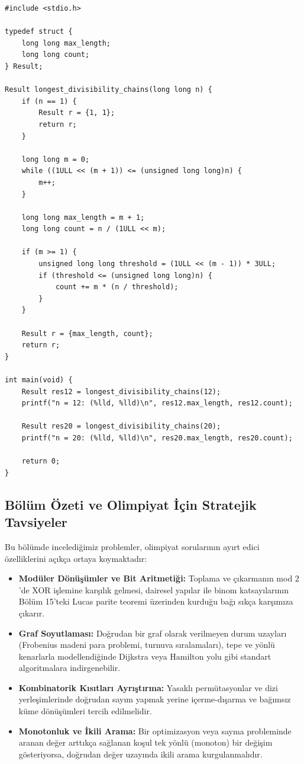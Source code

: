 \begin{lstlisting}[language=CTemel]
#include <stdio.h>

typedef struct {
    long long max_length;
    long long count;
} Result;

Result longest_divisibility_chains(long long n) {
    if (n == 1) {
        Result r = {1, 1};
        return r;
    }

    long long m = 0;
    while ((1ULL << (m + 1)) <= (unsigned long long)n) {
        m++;
    }

    long long max_length = m + 1;
    long long count = n / (1ULL << m);

    if (m >= 1) {
        unsigned long long threshold = (1ULL << (m - 1)) * 3ULL;
        if (threshold <= (unsigned long long)n) {
            count += m * (n / threshold);
        }
    }

    Result r = {max_length, count};
    return r;
}

int main(void) {
    Result res12 = longest_divisibility_chains(12);
    printf("n = 12: (%lld, %lld)\n", res12.max_length, res12.count);

    Result res20 = longest_divisibility_chains(20);
    printf("n = 20: (%lld, %lld)\n", res20.max_length, res20.count);

    return 0;
}\end{lstlisting}

\subsection{Bölüm Özeti ve Olimpiyat İçin Stratejik Tavsiyeler}

Bu bölümde incelediğimiz problemler, olimpiyat sorularının ayırt edici özelliklerini açıkça ortaya koymaktadır:
\begin{itemize}
    \item \textbf{Modüler Dönüşümler ve Bit Aritmetiği:} Toplama ve çıkarmanın mod $2$'de XOR işlemine karşılık gelmesi, dairesel yapılar ile binom katsayılarının Bölüm 15'teki Lucas parite teoremi üzerinden kurduğu bağı sıkça karşımıza çıkarır.
\item \textbf{Graf Soyutlaması:} Doğrudan bir graf olarak verilmeyen durum uzayları (Frobenius madeni para problemi, turnuva sıralamaları), tepe ve yönlü kenarlarla modellendiğinde Dijkstra veya Hamilton yolu gibi standart algoritmalara indirgenebilir.
    \item \textbf{Kombinatorik Kısıtları Ayrıştırma:} Yasaklı permütasyonlar ve dizi yerleşimlerinde doğrudan sayım yapmak yerine içerme-dışarma ve bağımsız küme dönüşümleri tercih edilmelidir.
    \item \textbf{Monotonluk ve İkili Arama:} Bir optimizasyon veya sayma probleminde aranan değer arttıkça sağlanan koşul tek yönlü (monoton) bir değişim gösteriyorsa, doğrudan değer uzayında ikili arama kurgulanmalıdır.
\end{itemize}
